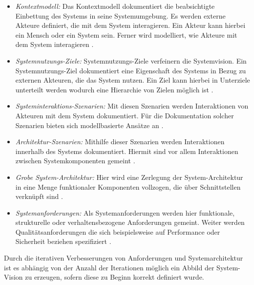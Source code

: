 \begin{itemize}
\item \emph{Kontextmodell:}
Das Kontextmodell dokumentiert die beabsichtigte Einbettung des Systems in seine Systemumgebung. Es werden externe Akteure definiert, die mit dem System interagieren. Ein Akteur kann hierbei ein Mensch oder ein System sein. Ferner wird modelliert, wie Akteure mit dem System interagieren \cite{Poh01}.
\item \emph{Systemnutzungs-Ziele:}
Systemnutzungs-Ziele verfeinern die Systemvision. Ein Systemnutzungs-Ziel dokumentiert eine Eigenschaft des Systems in Bezug zu externen Akteuren, die das System nutzen. Ein Ziel kann hierbei in Unterziele unterteilt werden wodurch eine Hierarchie von Zielen m\"oglich ist \cite{Poh01}.  
\item \emph{Systeminteraktions-Szenarien:}
Mit diesen Szenarien werden Interaktionen von Akteuren mit dem System dokumentiert. F\"ur die Dokumentation solcher Szenarien bieten sich modellbasierte Ans\"atze an \cite{Poh01}.
\item \emph{Architektur-Szenarien:}
Mithilfe dieser Szenarien werden Interaktionen innerhalb des Systems dokumentiert. Hiermit sind vor allem Interaktionen zwischen Systemkomponenten gemeint \cite{Poh01}. 
\item \emph{Grobe System-Architektur:}
Hier wird eine Zerlegung der System-Architektur in eine Menge funktionaler Komponenten vollzogen, die \"uber Schnittstellen verkn\"upft sind \cite{Poh01}.
\item \emph{Systemanforderungen:}
Als Systemanforderungen werden hier funktionale, strukturelle oder verhaltensbezogene Anforderungen gemeint. Weiter werden Qualit\"atsanforderungen die sich beispielsweise auf Performance oder Sicherheit beziehen spezifiziert \cite{Poh01}.\\
\end{itemize}

Durch die iterativen Verbesserungen von Anforderungen und Systemarchitektur ist es abh\"angig von der Anzahl der Iterationen m\"oglich ein Abbild der System-Vision zu erzeugen, sofern diese zu Beginn korrekt definiert wurde.
